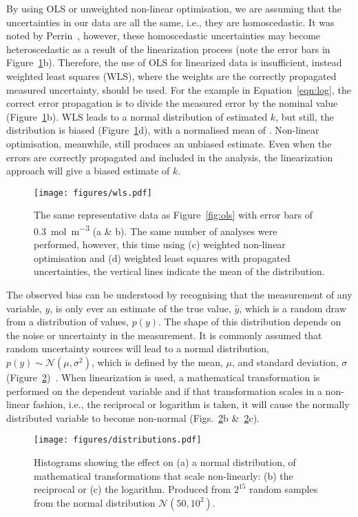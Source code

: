 \documentclass[journal=jceda8,manuscript=article]{achemso}
\begin{document}
By using OLS or unweighted non-linear optimisation, we are assuming that the uncertainties in our data are all the same, i.e., they are homoscedastic. 
It was noted by Perrin~\cite{perrin_linear_2017}, however, these homoscedastic uncertainties may become heteroscedastic as a result of the linearization process (note the error bars in Figure~\ref{fig:wls}b). 
Therefore, the use of OLS for linearized data is insufficient, instead weighted least squares (WLS), where the weights are the correctly propagated measured uncertainty, should be used.
For the example in Equation~\ref{eqn:log}, the correct error propagation is to divide the measured error by the nominal value (Figure~\ref{fig:wls}b).
WLS leads to a normal distribution of estimated $k$, but still, the distribution is biased (Figure~\ref{fig:wls}d), with a normalised mean of .
Non-linear optimisation, meanwhile, still produces an unbiased estimate.
Even when the errors are correctly propagated and included in the analysis, the linearization approach will give a biased estimate of $k$.
%
\begin{figure}
  \texttt{[image: figures/wls.pdf]}
  \caption{
    The same representative data as Figure~\ref{fig:ols} with error bars of \SI{0.3}{{\mol\m^{-3}}} (a \& b).
    The same number of analyses were performed, however, this time using (c) weighted non-linear optimisation and (d) weighted least squares with propagated uncertainties, the vertical lines indicate the mean of the distribution. 
    }
  \label{fig:wls}
\end{figure}
%

The observed bias can be understood by recognising that the measurement of any variable, $y$, is only ever an estimate of the true value, $\hat{y}$, which is a random draw from a distribution of values, $p(y)$. 
The shape of this distribution depends on the noise or uncertainty in the measurement. 
It is commonly assumed that random uncertainty sources will lead to a normal distribution, $p(y) \sim \mathcal{N}(\mu, \sigma^2)$, which is defined by the mean, $\mu$, and standard deviation, $\sigma$ (Figure~\ref{fig:distributions})~\cite{monk_math_2010}.
When linearization is used, a mathematical transformation is performed on the dependent variable and if that transformation scales in a non-linear fashion, i.e., the reciprocal or logarithm is taken, it will cause the normally distributed variable to become non-normal (Figs.~\ref{fig:distributions}b \&~\ref{fig:distributions}c).
%
\begin{figure}
  \texttt{[image: figures/distributions.pdf]}
  \caption{  
    Histograms showing the effect on (a) a normal distribution, of mathematical transformations that scale non-linearly: (b) the reciprocal or (c) the logarithm. 
    Produced from $2^{15}$ random samples from the normal distribution $\mathcal{N}(50, 10^2)$.
    }
  \label{fig:distributions}
\end{figure}
%
\end{document}
